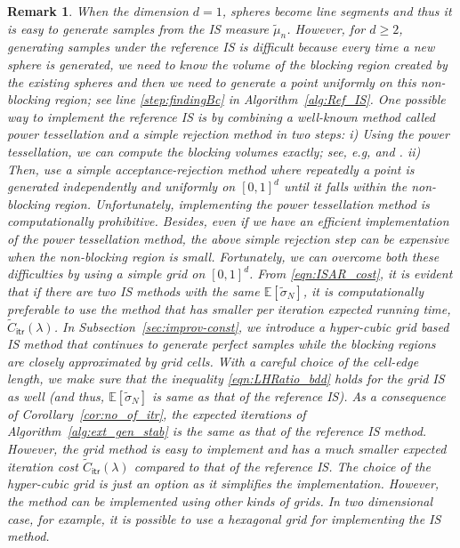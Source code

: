 \documentclass[11pt]{article}
\newcommand{\ee}{\mathbb{E}}
\newcommand{\wt}{\widetilde}
\newtheorem{remark}{Remark}
\begin{document}
\begin{remark}
\label{rem:tessellation}
\normalfont
When the dimension $d = 1$, spheres become line segments and thus it is easy to generate samples from the IS measure $\wt \mu_n$. However, for $d \geq 2$, generating samples under the reference IS is difficult because every time a new sphere is generated, we need to know  the volume of the blocking region created by the existing spheres and then we need to generate a point uniformly on this non-blocking region; see line \ref{step:findingBc} in Algorithm~\ref{alg:Ref_IS}.
One possible way to implement the reference IS is by combining a well-known method called {\em power tessellation} and a simple rejection method in two steps: i) Using the power tessellation, we can compute the blocking volumes exactly; see, e.g, \cite{Aurenhammer87} and \cite{MH08}.  ii) Then, use a simple acceptance-rejection method where repeatedly a point  is generated independently and uniformly on $[0,1]^d$ until it falls within the non-blocking region. Unfortunately,  implementing  the power tessellation method is computationally prohibitive. Besides, even if we have an efficient implementation of the power tessellation method, the above simple rejection step can be expensive when the non-blocking region is small. 
Fortunately, we can overcome both these difficulties by using a simple grid on $[0,1]^d$. From \eqref{eqn:ISAR_cost}, it is evident that if there are two IS methods with the same $\ee[\wt \sigma_N]$, it is computationally preferable to use the method that has smaller per iteration expected running time, $\wt C_{\mathsf{itr}}(\lambda)$. In Subsection~\ref{sec:improv-const}, we introduce a hyper-cubic grid based IS method that continues to generate perfect samples  while the blocking regions are closely approximated by grid cells. With a careful choice of the cell-edge length, we make sure that the inequality \eqref{eqn:LHRatio_bdd} holds for the grid IS as well (and thus, $\ee[\wt \sigma_N]$ is same as that of the reference IS). As a consequence of Corollary~\ref{cor:no_of_itr}, the expected iterations of Algorithm~\ref{alg:ext_gen_stab} is the same as that of the reference IS method. 
However, the grid method is easy to implement and has a much smaller expected iteration cost $\wt C_{\mathsf{itr}}(\lambda)$ compared to that of the reference IS. The choice of the hyper-cubic grid is just an option as it simplifies the implementation. However, the method can be implemented using other kinds of grids. In two dimensional case, for example, it is possible to use a hexagonal grid for implementing the IS method.
\end{remark}
\end{document}
